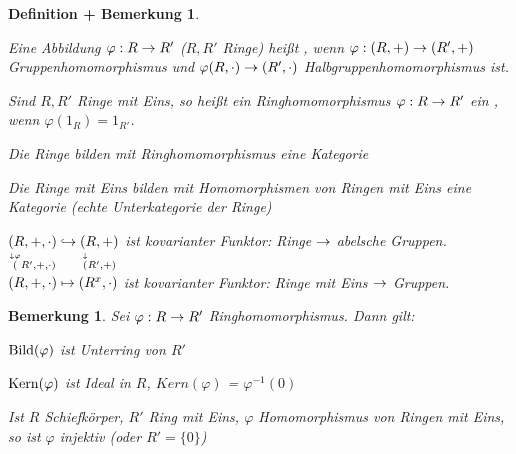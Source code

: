 \documentclass[a4paper,10pt,german]{scrbook}
\theoremstyle{saetze}
\theoremstyle{definitionen}
\newtheorem{DefBem}[Def]{Definition + Bemerkung}
\newtheorem{Bem}[Def]{Bemerkung}
\begin{document}
\begin{DefBem}
\begin{enum}
\item Eine Abbildung $\varphi: R \rightarrow R'$ ($R,R'$ Ringe) heißt
, wenn $\varphi: (R,+) \rightarrow (R',+)$
Gruppenhomomorphismus und $\varphi(R,\cdot) \rightarrow (R',\cdot)$
Halbgruppenhomomorphismus ist.
\item Sind $R,R'$ Ringe mit Eins, so heißt ein Ringhomomorphismus
$\varphi: R \rightarrow R'$ ein , wenn
$\varphi(1_R) = 1_{R'}$.
\item Die Ringe bilden mit Ringhomomorphismus eine Kategorie
\item Die Ringe mit Eins bilden mit Homomorphismen von Ringen mit
Eins eine Kategorie (echte Unterkategorie der Ringe)
\item $\underset{\stackrel{\downarrow \varphi} (R',+,\cdot)}{(R,+,\cdot)}
\hookrightarrow \underset{\stackrel{\downarrow} (R',+)}{(R,+)}$ ist
kovarianter Funktor: Ringe $\rightarrow$ abelsche Gruppen.
\medskip\newline$(R,+, \cdot) \mapsto (R^x, \cdot)$ ist kovarianter
Funktor: Ringe mit Eins $\rightarrow$ Gruppen.
\end{enum}
\end{DefBem}

\begin{Bem}
Sei $\varphi: R \rightarrow R'$ Ringhomomorphismus.
Dann gilt:
\begin{enum}
\item $\mathop{\rm Bild}\nolimits(\varphi)$ ist Unterring von $R'$
\item $\mathop{\rm Kern}\nolimits(\varphi)$ ist Ideal in $R$, $Kern(\varphi)$ =
$\varphi^{-1}(0)$ \newline
{}
\item Ist $R$ Schiefkörper, $R'$ Ring mit Eins, $\varphi$ Homomorphismus von Ringen mit
Eins, so ist $\varphi$ injektiv (oder $R' = \{0\}$)

\end{enum}
\end{Bem}
\end{document}
